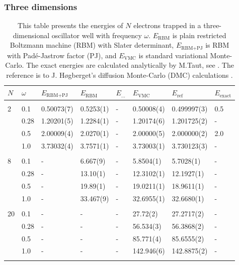 \subsubsection{Three dimensions}
\begin{table} [H]
	\caption{This table presents the energies of $N$ electrons trapped in a three-dimensional oscillator well with frequency $\omega$. $E_{\text{RBM}}$ is plain restricted Boltzmann machine (RBM) with Slater determinant, $E_{\text{RBM+PJ}}$ is RBM with Padé-Jastrow factor (PJ), and $E_{\text{VMC}}$ is standard variational Monte-Carlo. The exact energies are calculated analytically by M.Taut, see \cite{taut_two_1993}. The reference is to J. Høgberget's diffusion Monte-Carlo (DMC) calculations \cite{hogberget_quantum_2013}. } 
	\begin{tabularx}{\textwidth}{l:l|XXXXXX} \hline\hline
		\label{tab:quantumdotswinteraction3D}
		$N$ & $\omega$ & $E_{\text{RBM+PJ}}$ & $E_{\text{RBM}}$ & $E_{\text{...}}$ & $E_{\text{VMC}}$ & $E_{\text{ref}} $ & $E_{\text{exact}}$ \\ \hline \\
		2 & 0.1 & 0.50073(7) & 0.5253(1) & - & 0.50008(4) & 0.499997(3) & 0.5 \\
		& 0.28 & 1.20201(5) & 1.2284(1) & - & 1.20174(6) & 1.201725(2) & - \\
		& 0.5 & 2.00009(4) & 2.0270(1) & - & 2.00000(5) & 2.000000(2) & 2.0 \\
		& 1.0 & 3.73032(4) & 3.7571(1) & - & 3.73003(1) & 3.730123(3) & - \\ \hdashline \\
		
		8 & 0.1 & - & 6.667(9) & - & 5.8504(1) & 5.7028(1) & -\\ 
		& 0.28 & - & 13.10(1) & - & 12.3102(1) & 12.1927(1) & -\\
		& 0.5 & - & 19.89(1) & - & 19.0211(1) & 18.9611(1) & -\\
		& 1.0 & - & 33.467(9) & - & 32.6955(1) & 32.6680(1) & -\\ \hdashline \\
		
		20 & 0.1 & - & - & - & 27.72(2) & 27.2717(2) & -\\ 
		& 0.28 & - & - & - & 56.534(3) & 56.3868(2) & -\\
		& 0.5 & - & - & - & 85.771(4) & 85.6555(2) & -\\
		& 1.0 & - & - & - & 142.946(6) & 142.8875(2) & -\\ \hdashline \\
		

\end{tabularx}
\end{table}

